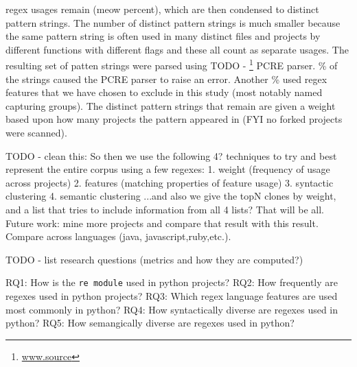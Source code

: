  regex usages remain (meow percent), which are then condensed to  distinct pattern strings.  The number of distinct pattern strings is much smaller because the same pattern string is often used in many distinct files and projects by different functions with different flags and these all count as separate usages.  The resulting set of patten strings were parsed using TODO - \footnote{\url{www.source}} PCRE parser.  \% of the strings caused the PCRE parser to raise an error.  Another \% used regex features that we have chosen to exclude in this study (most notably named capturing groups).  The  distinct pattern strings that remain are given a weight based upon how many projects the pattern appeared in (FYI no forked projects were scanned).

TODO - clean this: So then we use the following 4? techniques to try and best represent the entire corpus using a few regexes: 1. weight (frequency of usage across projects) 2. features (matching properties of feature usage) 3. syntactic clustering 4. semantic clustering ...and also we give the topN clones by weight, and a list that tries to include information from all 4 lists?  That will be all.  Future work: mine more projects and compare that result with this result.  Compare across languages (java, javascript,ruby,etc.).

TODO - list research questions (metrics and how they are computed?)

RQ1: How is the {\tt re module} used in python projects?
RQ2: How frequently are regexes used in python projects?
RQ3: Which regex language features are used most commonly in python?
RQ4: How syntactically diverse are regexes used in python?
RQ5: How semangically diverse are regexes used in python?



